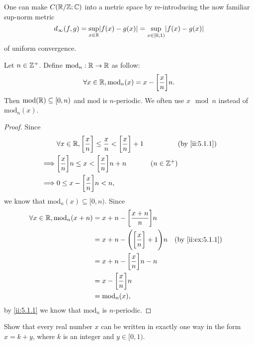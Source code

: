 \begin{note}
  One can make \(C(\mathbb{R} / \mathbb{Z} ; \mathbb{C})\) into a metric space by re-introducing the now familiar sup-norm metric
  \[
    d_\infty(f, g) = \sup_{x \in \R} \abs{f(x) - g(x)} = \sup_{x \in [0, 1)} \abs{f(x) - g(x)}
  \]
  of uniform convergence.
\end{note}

\begin{ac}\label{ii:ac:5.1.1}
  Let \(n \in \mathbb{Z}^+\).
  Define \(\text{mod}_n : \mathbb{R} \to \mathbb{R}\) as follow:
  \[
    \forall x \in \mathbb{R}, \text{mod}_n(x) = x - \bigg[\dfrac{x}{n}\bigg] n.
  \]
  Then \(\text{mod}(\mathbb{R}) \subseteq [0, n)\) and \(\text{mod}\) is \(n\)-periodic.
  We often use \(x \mod n\) instead of \(\text{mod}_n(x)\).
\end{ac}

\begin{proof}
  Since
  \begin{align*}
             & \forall x \in \R, \bigg[\dfrac{x}{n}\bigg] \leq \dfrac{x}{n} < \bigg[\dfrac{x}{n}\bigg] + 1 &              & \by{ii:5.1.1} \\
    \implies & \bigg[\dfrac{x}{n}\bigg] n \leq x < \bigg[\dfrac{x}{n}\bigg] n + n                          & (n \in \Z^+)              \\
    \implies & 0 \leq x - \bigg[\dfrac{x}{n}\bigg] n < n,
  \end{align*}
  we know that \(\text{mod}_n(x) \subseteq [0, n)\).
  Since
  \begin{align*}
    \forall x \in \R, \text{mod}_n(x + n) & = x + n - \bigg[\dfrac{x + n}{n}\bigg] n                                \\
                                          & = x + n - \Bigg(\bigg[\dfrac{x}{n}\bigg] + 1\Bigg) n &  & \by{ii:ex:5.1.1} \\
                                          & = x + n - \bigg[\dfrac{x}{n}\bigg] n - n                                \\
                                          & = x - \bigg[\dfrac{x}{n}\bigg] n                                        \\
                                          & = \text{mod}_n(x),
  \end{align*}
  by \cref{ii:5.1.1} we know that \(\text{mod}_n\) is \(n\)-periodic.
\end{proof}

\exercisesection

\begin{ex}\label{ii:ex:5.1.1}
  Show that every real number \(x\) can be written in exactly one way in the form \(x = k + y\), where \(k\) is an integer and \(y \in [0, 1)\).
\end{ex}

